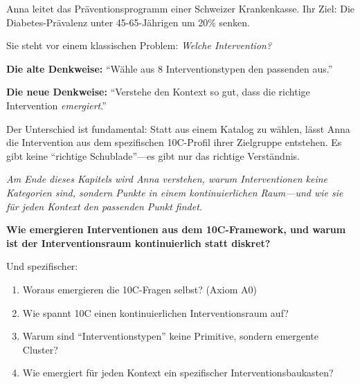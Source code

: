 \begin{tcolorbox}[colback=yellow!5!white, colframe=yellow!75!black,
    title=Intuition: Anna und die unendlichen M\"{o}glichkeiten]

Anna leitet das Pr\"{a}ventionsprogramm einer Schweizer Krankenkasse. Ihr Ziel: Die Diabetes-Pr\"{a}valenz unter 45-65-J\"{a}hrigen um 20\% senken.

Sie steht vor einem klassischen Problem: \textit{Welche Intervention?}

\textbf{Die alte Denkweise:} ``W\"{a}hle aus 8 Interventionstypen den passenden aus.''

\textbf{Die neue Denkweise:} ``Verstehe den Kontext so gut, dass die richtige Intervention \textit{emergiert}.''

Der Unterschied ist fundamental: Statt aus einem Katalog zu w\"{a}hlen, l\"{a}sst Anna die Intervention aus dem spezifischen 10C-Profil ihrer Zielgruppe entstehen. Es gibt keine ``richtige Schublade''---es gibt nur das richtige Verst\"{a}ndnis.

\textit{Am Ende dieses Kapitels wird Anna verstehen, warum Interventionen keine Kategorien sind, sondern Punkte in einem kontinuierlichen Raum---und wie sie f\"{u}r jeden Kontext den passenden Punkt findet.}
\end{tcolorbox}

\begin{tcolorbox}[colback=red!5!white, colframe=red!75!black,
    title=Die Zentrale Frage]
\textbf{Wie emergieren Interventionen aus dem 10C-Framework, und warum ist der Interventionsraum kontinuierlich statt diskret?}

Und spezifischer:
\begin{enumerate}[nosep]
\item Woraus emergieren die 10C-Fragen selbst? (Axiom A0)
\item Wie spannt 10C einen kontinuierlichen Interventionsraum auf?
\item Warum sind ``Interventionstypen'' keine Primitive, sondern emergente Cluster?
\item Wie emergiert f\"{u}r jeden Kontext ein spezifischer Interventionsbaukasten?
\end{enumerate}
\end{tcolorbox}

